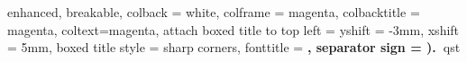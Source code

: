 \usepackage{wallpaper}

\usepackage{draftwatermark}

\usepackage[displaymath,left]{lineno}

\usepackage{rotating}

\usepackage{graphicx}

\usepackage{multirow}

\usepackage{amsmath}

\usepackage{tcolorbox}
%
{enhanced, breakable,
  colback = white, colframe = magenta, colbacktitle = magenta, coltext=magenta,
  attach boxed title to top left = {yshift = -3mm, xshift = 5mm},
  boxed title style = {sharp corners},
  fonttitle = \sffamily\bfseries, separator sign = {).~}}{qst}

\usepackage{minted}






